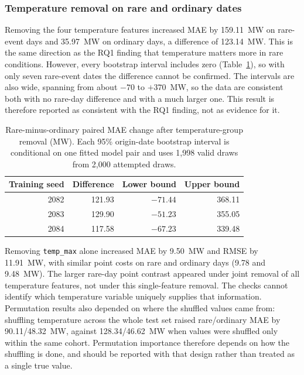 \documentclass[11pt,a4paper]{article}
\newcommand{\feat}[1]{\texttt{#1}}
\begin{document}
\subsubsection{Temperature removal on rare and ordinary dates}
Removing the four temperature features increased MAE by 159.11~MW on rare-event days and 35.97~MW on ordinary days, a difference of 123.14~MW. This is the same direction as the RQ1 finding that temperature matters more in rare conditions. However, every bootstrap interval includes zero (Table~\ref{tab:rq2rare}), so with only seven rare-event dates the difference cannot be confirmed. The intervals are also wide, spanning from about $-70$ to $+370$~MW, so the data are consistent both with no rare-day difference and with a much larger one. This result is therefore reported as consistent with the RQ1 finding, not as evidence for it.

\begin{table}[htbp]
\centering\small
\caption{Rare-minus-ordinary paired MAE change after temperature-group removal (MW). Each 95\% origin-date bootstrap interval is conditional on one fitted model pair and uses 1{,}998 valid draws from 2{,}000 attempted draws.}
\label{tab:rq2rare}
\begin{tabular}{r r r r}
\toprule
Training seed & Difference & Lower bound & Upper bound \\
\midrule
2082 & 121.93 & $-71.44$ & 368.11 \\
2083 & 129.90 & $-51.23$ & 355.05 \\
2084 & 117.58 & $-67.23$ & 339.48 \\
\bottomrule
\end{tabular}
\end{table}

Removing \feat{temp\_max} alone increased MAE by 9.50~MW and RMSE by 11.91~MW, with similar point costs on rare and ordinary days (9.78 and 9.48~MW). The larger rare-day point contrast appeared under joint removal of all temperature features, not under this single-feature removal. The checks cannot identify which temperature variable uniquely supplies that information. Permutation results also depended on where the shuffled values came from: shuffling temperature across the whole test set raised rare/ordinary MAE by 90.11/48.32~MW, against 128.34/46.62~MW when values were shuffled only within the same cohort. Permutation importance therefore depends on how the shuffling is done, and should be reported with that design rather than treated as a single true value.
\end{document}
